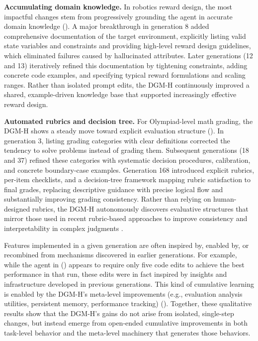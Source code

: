 \documentclass[]{fairmeta}
\begin{document}
\textbf{Accumulating domain knowledge.} In robotics reward design, the most impactful changes stem from progressively grounding the agent in accurate domain knowledge (). A major breakthrough in generation 8 added comprehensive documentation of the target environment, explicitly listing valid state variables and constraints and providing high-level reward design guidelines, which eliminated failures caused by hallucinated attributes. Later generations (12 and 13) iteratively refined this documentation by tightening constraints, adding concrete code examples, and specifying typical reward formulations and scaling ranges. Rather than isolated prompt edits, the DGM-H continuously improved a shared, example-driven knowledge base that supported increasingly effective reward design.

\textbf{Automated rubrics and decision tree.} For Olympiad-level math grading, the DGM-H shows a steady move toward explicit evaluation structure (). In generation 3, listing grading categories with clear definitions corrected the tendency to solve problems instead of grading them. Subsequent generations (18 and 37) refined these categories with systematic decision procedures, calibration, and concrete boundary-case examples. Generation 168 introduced explicit rubrics, per-item checklists, and a decision-tree framework mapping rubric satisfaction to final grades, replacing descriptive guidance with precise logical flow and substantially improving grading consistency.
Rather than relying on human-designed rubrics, the DGM-H autonomously discovers evaluative structures that mirror those used in recent rubric-based approaches to improve consistency and interpretability in complex judgments \citep{cook2024ticking, fan2024sedareval, chen2026automated, lv2026rubrics}.

Features implemented in a given generation are often inspired by, enabled by, or recombined from mechanisms discovered in earlier generations. For example, while the agent in () appears to require only five code edits to achieve the best performance in that run, these edits were in fact inspired by insights and infrastructure developed in previous generations. This kind of cumulative learning is enabled by the DGM-H's meta-level improvements (e.g., evaluation analysis utilities, persistent memory, performance tracking) (). Together, these qualitative results show that the DGM-H's gains do not arise from isolated, single-step changes, but instead emerge from open-ended cumulative improvements in both task-level behavior and the meta-level machinery that generates those behaviors.
\end{document}
